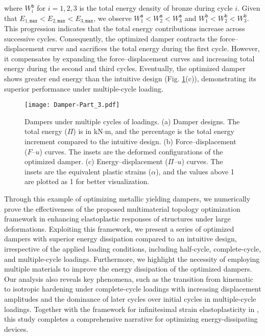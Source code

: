 \documentclass[preprint,11pt]{elsarticle}
\theoremstyle{definition}
\begin{document}
where $W_i^\texttt{b}$ for $i=1,2,3$ is the total energy density of bronze during cycle $i$. Given that $E_{1,\texttt{max}} < E_{2,\texttt{max}} < E_{3,\texttt{max}}$, we observe $W_1^\texttt{s} < W_2^\texttt{s} < W_3^\texttt{s}$ and $W_1^\texttt{b} < W_2^\texttt{b} < W_3^\texttt{b}$. This progression indicates that the total energy contributions increase across successive cycles. Consequently, the optimized damper contracts the force--displacement curve and sacrifices the total energy during the first cycle. However, it compensates by expanding the force--displacement curves and increasing total energy during the second and third cycles. Eventually, the optimized damper shows greater end energy than the intuitive design (Fig. \ref{Fig: Damper-Part 3}(c)), demonstrating its superior performance under multiple-cycle loading.

\begin{figure}[!htbp]
    \centering
    \texttt{[image: Damper-Part\_3.pdf]}
    \caption{Dampers under multiple cycles of loadings. (a) Damper designs. The total energy ($\Pi$) is in kN$\cdot$m, and the percentage is the total energy increment compared to the intuitive design. (b) Force--displacement ($F$--$u$) curves. The insets are the deformed configurations of the optimized damper. (c) Energy--displacement ($\Pi$--$u$) curves. The insets are the equivalent plastic strains ($\alpha$), and the values above 1 are plotted as 1 for better visualization.}
    \label{Fig: Damper-Part 3}
\end{figure}

Through this example of optimizing metallic yielding dampers, we numerically prove the effectiveness of the proposed multimaterial topology optimization framework in enhancing elastoplastic responses of structures under large deformations. Exploiting this framework, we present a series of optimized dampers with superior energy dissipation compared to an intuitive design, irrespective of the applied loading conditions, including half-cycle, complete-cycle, and multiple-cycle loadings. Furthermore, we highlight the necessity of employing multiple materials to improve the energy dissipation of the optimized dampers. Our analysis also reveals key phenomena, such as the transition from kinematic to isotropic hardening under complete-cycle loadings with increasing displacement amplitudes and the dominance of later cycles over initial cycles in multiple-cycle loadings. Together with the framework for infinitesimal strain elastoplasticity in \citet{jia_multimaterial_2025}, this study completes a comprehensive narrative for optimizing energy-dissipating devices. 
\end{document}

